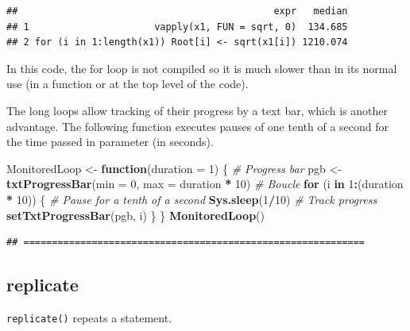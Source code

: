 \documentclass[
  12pt,
  american,
  a4paper,
  extrafontsizes,onecolumn,openright
  ]{memoir}
\newenvironment{Shaded}{\begin{snugshade}}{\end{snugshade}}
\newcommand{\AttributeTok}[1]{\textcolor[rgb]{0.13,0.29,0.53}{#1}}
\newcommand{\CommentTok}[1]{\textcolor[rgb]{0.56,0.35,0.01}{\textit{#1}}}
\newcommand{\ControlFlowTok}[1]{\textcolor[rgb]{0.13,0.29,0.53}{\textbf{#1}}}
\newcommand{\DecValTok}[1]{\textcolor[rgb]{0.00,0.00,0.81}{#1}}
\newcommand{\FunctionTok}[1]{\textcolor[rgb]{0.13,0.29,0.53}{\textbf{#1}}}
\newcommand{\NormalTok}[1]{#1}
\newcommand{\OtherTok}[1]{\textcolor[rgb]{0.56,0.35,0.01}{#1}}
\newcommand{\SpecialCharTok}[1]{\textcolor[rgb]{0.81,0.36,0.00}{\textbf{#1}}}
\begin{document}
\begin{verbatim}
##                                             expr   median
## 1                      vapply(x1, FUN = sqrt, 0)  134.685
## 2 for (i in 1:length(x1)) Root[i] <- sqrt(x1[i]) 1210.074
\end{verbatim}

\normalsize

In this code, the for loop is not compiled so it is much slower than in its normal use (in a function or at the top level of the code).

The long loops allow tracking of their progress by a text bar, which is another advantage.
The following function executes pauses of one tenth of a second for the time passed in parameter (in seconds).

\scriptsize

\begin{Shaded}
\begin{Highlighting}[]
\NormalTok{MonitoredLoop }\OtherTok{\textless{}{-}} \ControlFlowTok{function}\NormalTok{(}\AttributeTok{duration =} \DecValTok{1}\NormalTok{) \{}
    \CommentTok{\# Progress bar}
\NormalTok{    pgb }\OtherTok{\textless{}{-}} \FunctionTok{txtProgressBar}\NormalTok{(}\AttributeTok{min =} \DecValTok{0}\NormalTok{, }\AttributeTok{max =}\NormalTok{ duration }\SpecialCharTok{*} \DecValTok{10}\NormalTok{)}
    \CommentTok{\# Boucle}
    \ControlFlowTok{for}\NormalTok{ (i }\ControlFlowTok{in} \DecValTok{1}\SpecialCharTok{:}\NormalTok{(duration }\SpecialCharTok{*} \DecValTok{10}\NormalTok{)) \{}
        \CommentTok{\# Pause for a tenth of a second}
        \FunctionTok{Sys.sleep}\NormalTok{(}\DecValTok{1}\SpecialCharTok{/}\DecValTok{10}\NormalTok{)}
        \CommentTok{\# Track progress}
        \FunctionTok{setTxtProgressBar}\NormalTok{(pgb, i)}
\NormalTok{    \}}
\NormalTok{\}}
\FunctionTok{MonitoredLoop}\NormalTok{()}
\end{Highlighting}
\end{Shaded}

\begin{verbatim}
## ============================================================
\end{verbatim}

\normalsize

\subsection{replicate}\label{replicate}

\texttt{replicate()} repeats a statement.
\end{document}
